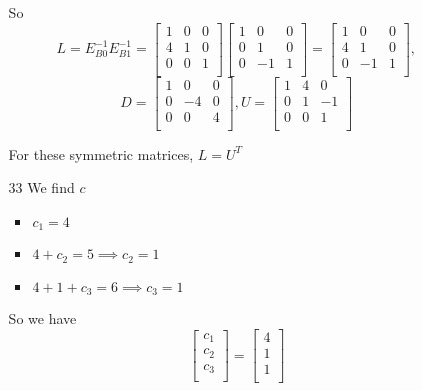 \documentclass[12pt,letterpaper]{article}
\begin{document}
\begin{enumerate}
\begin{enumerate}
          So
          \[
            L
            =
            E_{B0}^{-1}E_{B1}^{-1}
            =
            \begin{bmatrix}
               1 &  0 &  0 \\
               4 &  1 &  0 \\
               0 &  0 &  1 \\
            \end{bmatrix}
            \begin{bmatrix}
               1 &  0 &  0 \\
               0 &  1 &  0 \\
               0 & -1 &  1 \\
            \end{bmatrix}
            =
            \begin{bmatrix}
               1 &  0 &  0 \\
               4 &  1 &  0 \\
               0 & -1 &  1 \\
            \end{bmatrix}
            ,
          \]
          \[
            D
            =
            \begin{bmatrix}
               1 &  0 &  0 \\
               0 & -4 &  0 \\
               0 &  0 &  4 \\
            \end{bmatrix}
            ,
            U
            =
            \begin{bmatrix}
               1 &  4 &  0 \\
               0 &  1 & -1 \\
               0 &  0 &  1 \\
            \end{bmatrix}
          \]

          For these symmetric matrices, $L = U^T$
        \item [33]
          We find $c$
          \begin{itemize}
            \item $c_1             = 4$
            \item $4   + c_2       = 5 \implies c_2 = 1$
            \item $4   + 1   + c_3 = 6 \implies c_3 = 1$
          \end{itemize}

          So we have
          \[
            \begin{bmatrix}
              c_1 \\
              c_2 \\
              c_3 \\
            \end{bmatrix}
            =
            \begin{bmatrix}
              4 \\
              1 \\
              1 \\
            \end{bmatrix}
          \]


\end{enumerate}
\end{enumerate}
\end{document}
